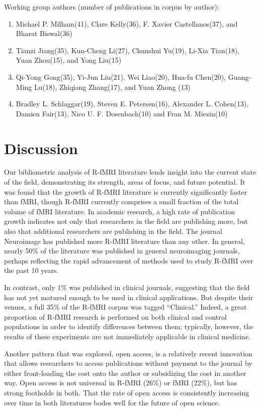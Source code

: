 \documentclass[12pt,3p]{elsarticle}
\begin{document}
Working group authors (number of publications in corpus by author):
\begin{enumerate}
\item Michael P. Milham(41), Clare Kelly(36), F. Xavier Castellanos(37), and
Bharat Biswal(36) 
\item Tianzi Jiang(35), Kun-Cheng Li(27), Chunshui Yu(19),
Li-Xia Tian(18), Yuan Zhou(15), and Yong Liu(15) 
\item Qi-Yong Gong(35), Yi-Jun Liu(21), Wei Liao(20), Hua-fu Chen(20),
Guang-Ming Lu(18), Zhiqiang Zhang(17), and Yuan Zhong (13) 
\item Bradley L. Schlaggar(19), Steven E. Petersen(16), Alexander L.
Cohen(13), Damien Fair(13), Nico U. F. Dosenbach(10) and Fran M. Miezin(10)
\end{enumerate}

\section{Discussion}

Our bibliometric analysis of R-fMRI literature lends insight into the current
state of the field, demonstrating its strength, areas of focus, and future
potential. It was found that the growth of R-fMRI literature is currently
significantly faster than fMRI, though R-fMRI currently comprises a small
fraction of the total volume of fMRI literature. In academic research, a high
rate of publication growth indicates not only that researchers in the field are
publishing more, but also that additional researchers are publishing in the
field. The journal Neuroimage has published more R-fMRI literature than any
other. In general, nearly 50\% of the literature was published in general
neuroimaging journals, perhaps reflecting the rapid advancement of methods used
to study R-fMRI over the past 10 years. 

In contrast, only 1\% was published in clinical journals, suggesting that the
field has not yet matured enough to be used in clinical applications. But
despite their venues, a full 35\% of the R-fMRI corpus was tagged “Clinical.”
Indeed, a great proportion of R-fMRI research is performed on both clinical and
control populations in order to identify differences between them; typically,
however, the results of these experiments are not immediately applicable in
clinical medicine.

Another pattern that was explored, open access, is a relatively recent
innovation that allows researchers to access publications without payment to the
journal by either front-loading the cost onto the author or subsidizing the cost
in another way. Open access is not universal in R-fMRI (26\%) or fMRI (22\%), but
has strong footholds in both. That the rate of open access is consistently
increasing over time in both literatures bodes well for the future of open
science.
\end{document}
